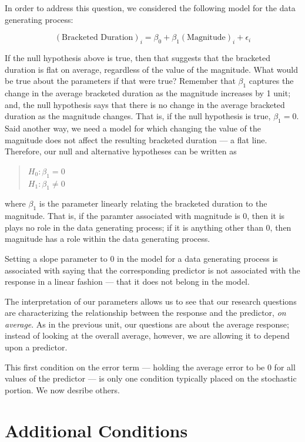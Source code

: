 \documentclass[]{book}
\theoremstyle{plain}
\theoremstyle{mydefn}
\theoremstyle{myexmpl}
\theoremstyle{remark}
\let\BeginKnitrBlock\begin \let\EndKnitrBlock\end
\let\BeginKnitrBlock\begin \let\EndKnitrBlock\end
\begin{document}
In order to address this question, we considered the following model for
the data generating process:

\[(\text{Bracketed Duration})_i = \beta_0 + \beta_1(\text{Magnitude})_i + \epsilon_i\]

If the null hypothesis above is true, then that suggests that the
bracketed duration is flat on average, regardless of the value of the
magnitude. What would be true about the parameters if that were true?
Remember that \(\beta_1\) captures the change in the average bracketed
duration as the magnitude increases by 1 unit; and, the null hypothesis
says that there is no change in the average bracketed duration as the
magnitude changes. That is, if the null hypothesis is true,
\(\beta_1 = 0\). Said another way, we need a model for which changing
the value of the magnitude does not affect the resulting bracketed
duration --- a flat line. Therefore, our null and alternative hypotheses
can be written as

\begin{quote}
\(H_0: \beta_1 = 0\)\\
\(H_1: \beta_1 \neq 0\)
\end{quote}

where \(\beta_1\) is the parameter linearly relating the bracketed
duration to the magnitude. That is, if the paramter associated with
magnitude is 0, then it is plays no role in the data generating process;
if it is anything other than 0, then magnitude has a role within the
data generating process.

\BeginKnitrBlock{rmdkeyidea}
Setting a slope parameter to 0 in the model for a data generating
process is associated with saying that the corresponding predictor is
not associated with the response in a linear fashion --- that it does
not belong in the model.
\EndKnitrBlock{rmdkeyidea}

The interpretation of our parameters allows us to see that our research
questions are characterizing the relationship between the response and
the predictor, \emph{on average}. As in the previous unit, our questions
are about the average response; instead of looking at the overall
average, however, we are allowing it to depend upon a predictor.

This first condition on the error term --- holding the average error to
be 0 for all values of the predictor --- is only one condition typically
placed on the stochastic portion. We now desribe others.

\section{Additional Conditions}\label{additional-conditions}
\end{document}
